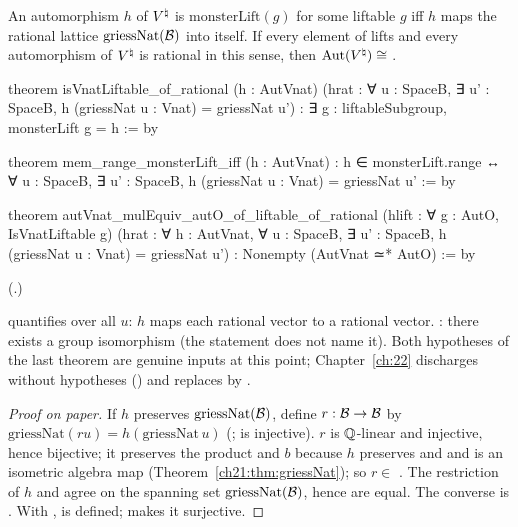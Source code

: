 \begin{theorem}\label{ch21:thm:rational}
An automorphism $h$ of ${V^{\natural}}$ is $\mathrm{monsterLift}(g)$ for some liftable $g$ iff $h$ maps the rational
lattice $\mathrm{griessNat}(\mathcal{B})$ into itself.  If every element of  lifts and every
automorphism of ${V^{\natural}}$ is rational in this sense, then $\operatorname{Aut}({V^{\natural}})\cong$ .
\end{theorem}
\begin{leancode}
theorem isVnatLiftable_of_rational (h : AutVnat)
    (hrat : ∀ u : SpaceB, ∃ u' : SpaceB, h (griessNat u : Vnat) = griessNat u') :
    ∃ g : liftableSubgroup, monsterLift g = h := by
\end{leancode}
\begin{leancode}
theorem mem_range_monsterLift_iff (h : AutVnat) :
    h ∈ monsterLift.range ↔ ∀ u : SpaceB, ∃ u' : SpaceB, h (griessNat u : Vnat) = griessNat u' := by
\end{leancode}
\begin{leancode}
theorem autVnat_mulEquiv_autO_of_liftable_of_rational (hlift : ∀ g : AutO, IsVnatLiftable g)
    (hrat : ∀ h : AutVnat, ∀ u : SpaceB, ∃ u' : SpaceB, h (griessNat u : Vnat) = griessNat u') :
    Nonempty (AutVnat ≃* AutO) := by
\end{leancode}
(.)
\begin{dictionary}
 quantifies over all $u$: $h$ maps each rational vector to a rational vector.
: there exists a group isomorphism (the statement does not name it).
Both hypotheses of the last theorem are genuine inputs at this point; Chapter~\ref{ch:22} discharges
 without hypotheses () and replaces  by
.
\end{dictionary}
\begin{proof}[Proof on paper]
If $h$ preserves $\mathrm{griessNat}(\mathcal{B})$, define $r:\mathcal{B}\to\mathcal{B}$ by
$\mathrm{griessNat}(r u)=h(\mathrm{griessNat}\,u)$ (;  is injective).
$r$ is ${\mathbb{Q}}$-linear and injective, hence bijective; it preserves the product and $b$ because $h$
preserves  and  and  is an isometric algebra map
(Theorem~\ref{ch21:thm:griessNat}); so $r\in$ .  The restriction of $h$ and
 agree on the spanning set $\mathrm{griessNat}(\mathcal{B})$, hence are equal.  The
converse is .  With ,  is defined;
 makes it surjective.
\end{proof}
